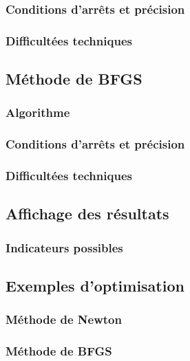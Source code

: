\documentclass[3p, twocolumn]{elsarticle}
\begin{document}
\subsubsection{Conditions d'arrêts et précision}
\subsubsection{Difficultées techniques}
\subsection{Méthode de BFGS}
\subsubsection{Algorithme}
\subsubsection{Conditions d'arrêts et précision}
\subsubsection{Difficultées techniques}
\subsection{Affichage des résultats}
\subsubsection{Indicateurs possibles}
\subsection{Exemples d'optimisation}
\subsubsection{Méthode de Newton}
\subsubsection{Méthode de BFGS}
\end{document}
